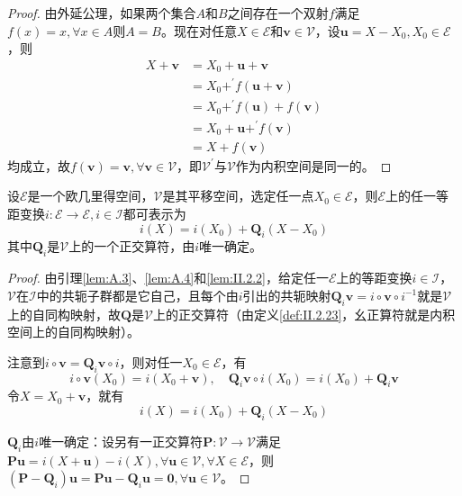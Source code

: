 \documentclass[../main.tex]{subfiles}
\begin{document}
\begin{proof}
    由外延公理，如果两个集合$A$和$B$之间存在一个双射$f$满足$f\left(x\right)=x,\forall x\in A$则$A=B$。现在对任意$X\in\mathcal{E}$和$\mathbf{v}\in\mathcal{V}$，设$\mathbf{u}=X-X_0,X_0\in\mathcal{E}$，则
    \begin{align*}
        X+\mathbf{v} & =X_0+\mathbf{u}+\mathbf{v}                                     \\
                     & =X_0+^\prime f\left(\mathbf{u}+\mathbf{v}\right)               \\
                     & =X_0+^\prime f\left(\mathbf{u}\right)+f\left(\mathbf{v}\right) \\
                     & =X_0+\mathbf{u}+^\prime f\left(\mathbf{v}\right)               \\
                     & =X+f\left(\mathbf{v}\right)
    \end{align*}
    均成立，故$f\left(\mathbf{v}\right)=\mathbf{v},\forall\mathbf{v}\in\mathcal{V}$，即$\mathcal{V}^\prime$与$\mathcal{V}$作为内积空间是同一的。
\end{proof}

\begin{theorem*}
    设$\mathcal{E}$是一个欧几里得空间，$\mathcal{V}$是其平移空间，选定任一点$X_0\in\mathcal{E}$，则$\mathcal{E}$上的任一等距变换$i:\mathcal{E}\rightarrow\mathcal{E},i\in\mathcal{I}$都可表示为
    \[
        i\left(X\right)=i\left(X_0\right)+\mathbf{Q}_i\left(X-X_0\right)
    \]
    其中$\mathbf{Q}_i$是$\mathcal{V}$上的一个正交算符，由$i$唯一确定。
\end{theorem*}
\begin{proof}
    由引理\ref{lem:A.3}、\ref{lem:A.4}和\ref{lem:II.2.2}，给定任一$\mathcal{E}$上的等距变换$i\in\mathcal{I}$，$\mathcal{V}$在$\mathcal{I}$中的共轭子群都是它自己，且每个由$i$引出的共轭映射$\mathbf{Q}_i\mathbf{v}=i\circ\mathbf{v}\circ i^{-1}$就是$\mathcal{V}$上的自同构映射，故$\mathbf{Q}$是$\mathcal{V}$上的正交算符（由定义\ref{def:II.2.23}，幺正算符就是内积空间上的自同构映射）。

    注意到$i\circ\mathbf{v}=\mathbf{Q}_i\mathbf{v}\circ i$，则对任一$X_0\in\mathcal{E}$，有
    \[i\circ \mathbf{v}\left(X_0\right)=i\left(X_0+\mathbf{v}\right),\quad \mathbf{Q}_i\mathbf{v}\circ i\left(X_0\right)=i\left(X_0\right)+\mathbf{Q}_i\mathbf{v}\]
    令$X=X_0+\mathbf{v}$，就有
    \[
        i\left(X\right)=i\left(X_0\right)+\mathbf{Q}_i\left(X-X_0\right)
    \]

    $\mathbf{Q}_i$由$i$唯一确定：设另有一正交算符$\mathbf{P}:\mathcal{V}\rightarrow\mathcal{V}$满足$\mathbf{Pu}=i\left(X+\mathbf{u}\right)-i\left(X\right),\forall\mathbf{u}\in\mathcal{V},\forall X\in\mathcal{E}$，则$\left(\mathbf{P}-\mathbf{Q}_i\right)\mathbf{u}=\mathbf{Pu}-\mathbf{Q}_i\mathbf{u}=\mathbf{0},\forall\mathbf{u}\in\mathcal{V}$。
\end{proof}
\end{document}
